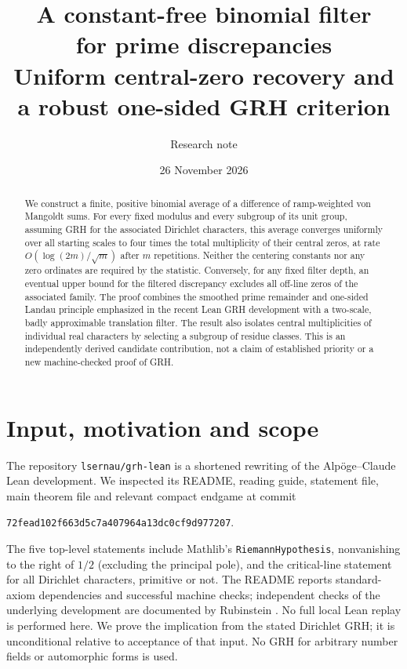 \documentclass[11pt]{article}
\title{\vspace{-1em}\bfseries A constant-free binomial filter\\ for prime discrepancies\\[5pt]\large Uniform central-zero recovery and a robust one-sided GRH criterion}
\author{Research note}
\date{26 November 2026}
\theoremstyle{remark}\newtheorem{remark}[theorem]{Remark}
\begin{document}
\maketitle
\begin{abstract}
We construct a finite, positive binomial average of a difference of ramp-weighted von Mangoldt sums. For every fixed modulus and every subgroup of its unit group, assuming GRH for the associated Dirichlet characters, this average converges uniformly over all starting scales to four times the total multiplicity of their central zeros, at rate $O(\log(2m)/\sqrt m)$ after $m$ repetitions. Neither the centering constants nor any zero ordinates are required by the statistic. Conversely, for any fixed filter depth, an eventual upper bound for the filtered discrepancy excludes all off-line zeros of the associated family. The proof combines the smoothed prime remainder and one-sided Landau principle emphasized in the recent Lean GRH development with a two-scale, badly approximable translation filter. The result also isolates central multiplicities of individual real characters by selecting a subgroup of residue classes. This is an independently derived candidate contribution, not a claim of established priority or a new machine-checked proof of GRH.
\end{abstract}

\section{Input, motivation and scope}
The repository \texttt{lsernau/grh-lean} \cite{repo} is a shortened rewriting of the Alp\"oge--Claude Lean development. We inspected its README, reading guide, statement file, main theorem file and relevant compact endgame at commit
\begin{center}\small\texttt{72fead102f663d5c7a407964a13dc0cf9d977207}.\end{center}
The five top-level statements include Mathlib's \texttt{RiemannHypothesis}, nonvanishing to the right of $1/2$ (excluding the principal pole), and the critical-line statement for all Dirichlet characters, primitive or not. The README reports standard-axiom dependencies and successful machine checks; independent checks of the underlying development are documented by Rubinstein \cite{rubinstein}. No full local Lean replay is performed here. We prove the implication from the stated Dirichlet GRH; it is unconditional relative to acceptance of that input. No GRH for arbitrary number fields or automorphic forms is used.
\end{document}
